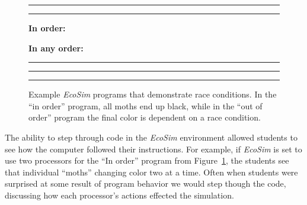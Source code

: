 \documentclass{sig-alternate}
\newcommand{\INDSTATE}[1][1]{\STATE\hspace{#1\algorithmicindent}}
\newcommand{\EcoSim}{\emph{EcoSim}}
\begin{document}
\begin{figure}
\hrule\hrule\vspace*{0.2em}
\begin{algorithmic}[1]\ttfamily\lsstyle
\item[{\bf In order:}]
  \INDSTATE{a position}
  \INDSTATE{a color}
\STATE{}
  \INDSTATE{do in order}
  \INDSTATE[2]{replace the moth's color with gray}
  \INDSTATE[2]{replace the moth's color with black}
\end{algorithmic}

\begin{algorithmic}[1]\ttfamily\lsstyle
\item[{\bf In any order:}]
  \INDSTATE{a position}
  \INDSTATE{a color}
\STATE{}
  \INDSTATE{do in any order}
  \INDSTATE[2]{replace the moth's color with gray}
  \INDSTATE[2]{replace the moth's color with black}
\end{algorithmic} 
\hrule\vspace{-0.8em}
\caption{Example \emph{EcoSim} programs that demonstrate race conditions.  In the
``in order'' program, all moths end up black, while in the ``out of order'' program
the final color is dependent on a race condition.}
\vspace*{0.2em}\hrule\hrule
\label{fig:race-conditions} 
\end{figure}

The ability to step through code in the {\EcoSim} environment allowed students to see how the computer followed their instructions.
For example, if \emph{EcoSim} is set to use two processors for the ``In order'' program from Figure~\ref{fig:race-conditions}, 
the students see that individual ``moths'' changing color two at a time.
Often when students were surprised at some result of program behavior
we would step though the code, discussing how each processor's actions effected the simulation.
\end{document}
